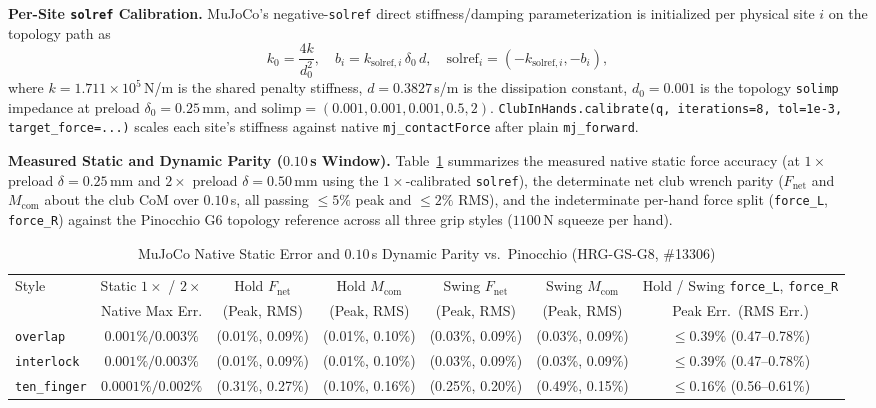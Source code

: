 \documentclass[11pt,a4paper]{article}
\begin{document}
\textbf{Per-Site \texttt{solref} Calibration.} MuJoCo's negative-\texttt{solref} direct stiffness/damping parameterization is initialized per physical site $i$ on the topology path as
\begin{equation}
k_{0} = \frac{4 k}{d_0^2}, \quad b_i = k_{\mathrm{solref},i} \, \delta_0 \, d, \quad \mathrm{solref}_i = (-k_{\mathrm{solref},i}, -b_i),
\end{equation}
where $k = 1.711 \times 10^5$\,N/m is the shared penalty stiffness, $d = 0.3827$\,s/m is the dissipation constant, $d_0 = 0.001$ is the topology \texttt{solimp} impedance at preload $\delta_0 = 0.25$\,mm, and $\mathrm{solimp} = (0.001, 0.001, 0.001, 0.5, 2)$.
\texttt{ClubInHands.calibrate(q, iterations=8, tol=1e-3, target\_force=...)} scales each site's stiffness against native \texttt{mj\_contactForce} after plain \texttt{mj\_forward}.

\textbf{Measured Static and Dynamic Parity ($0.10$\,s Window).} Table~\ref{tab:mujoco-topology-parity} summarizes the measured native static force accuracy (at $1\times$ preload $\delta = 0.25$\,mm and $2\times$ preload $\delta = 0.50$\,mm using the $1\times$-calibrated \texttt{solref}), the determinate net club wrench parity ($F_{\mathrm{net}}$ and $M_{\mathrm{com}}$ about the club CoM over $0.10$\,s, all passing $\le 5\%$ peak and $\le 2\%$ RMS), and the indeterminate per-hand force split (\texttt{force\_L}, \texttt{force\_R}) against the Pinocchio G6 topology reference across all three grip styles ($1100$\,N squeeze per hand).

\begin{table}[h]
\centering
\caption{MuJoCo Native Static Error and $0.10$\,s Dynamic Parity vs.\ Pinocchio (HRG-GS-G8, \#13306)}
\label{tab:mujoco-topology-parity}
\footnotesize
\begin{tabular}{@{}lcccccc@{}}
\toprule
Style & Static $1\times$ / $2\times$ & Hold $F_{\mathrm{net}}$ & Hold $M_{\mathrm{com}}$ & Swing $F_{\mathrm{net}}$ & Swing $M_{\mathrm{com}}$ & Hold / Swing \texttt{force\_L}, \texttt{force\_R} \\
 & Native Max Err. & (Peak, RMS) & (Peak, RMS) & (Peak, RMS) & (Peak, RMS) & Peak Err.\ (RMS Err.) \\
\midrule
\texttt{overlap}    & $0.001\% / 0.003\%$ & (0.01\%, 0.09\%) & (0.01\%, 0.10\%) & (0.03\%, 0.09\%) & (0.03\%, 0.09\%) & $\le 0.39\%$ (0.47--0.78\%) \\
\texttt{interlock}  & $0.001\% / 0.003\%$ & (0.01\%, 0.09\%) & (0.01\%, 0.10\%) & (0.03\%, 0.09\%) & (0.03\%, 0.09\%) & $\le 0.39\%$ (0.47--0.78\%) \\
\texttt{ten\_finger} & $0.0001\% / 0.002\%$ & (0.31\%, 0.27\%) & (0.10\%, 0.16\%) & (0.25\%, 0.20\%) & (0.49\%, 0.15\%) & $\le 0.16\%$ (0.56--0.61\%) \\
\bottomrule
\end{tabular}
\end{table}
\end{document}
